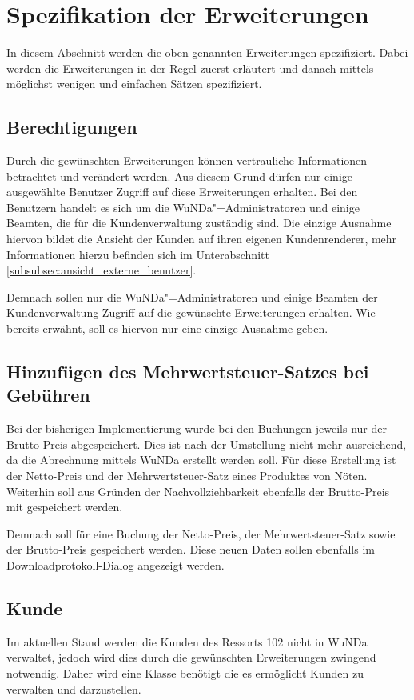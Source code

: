 \section{Spezifikation der Erweiterungen} \label{sec:spezifikation}
In diesem Abschnitt werden die oben genannten Erweiterungen spezifiziert. Dabei werden die Erweiterungen in der Regel zuerst erläutert und danach mittels möglichst wenigen und einfachen Sätzen spezifiziert.

\subsection{Berechtigungen} \label{subsec:berechtigungen}
Durch die gewünschten Erweiterungen können vertrauliche Informationen betrachtet und verändert werden.
Aus diesem Grund dürfen nur einige ausgewählte Benutzer Zugriff auf diese Erweiterungen erhalten.
Bei den Benutzern handelt es sich um die \ac{WuNDa}"=Administratoren und einige Beamten, die für die Kundenverwaltung zuständig sind.
Die einzige Ausnahme hiervon bildet die Ansicht der Kunden auf ihren eigenen Kundenrenderer, mehr Informationen hierzu befinden sich im Unterabschnitt \autoref{subsubsec:ansicht_externe_benutzer}. 

Demnach sollen nur die \ac{WuNDa}"=Administratoren und einige Beamten der Kundenverwaltung Zugriff auf die gewünschte Erweiterungen erhalten. Wie bereits erwähnt, soll es hiervon nur eine einzige Ausnahme geben.

\subsection{Hinzufügen des Mehrwertsteuer-Satzes bei Gebühren}
Bei der bisherigen Implementierung wurde bei den Buchungen jeweils nur der Brutto-Preis abgespeichert. Dies ist nach der Umstellung nicht mehr ausreichend, da die Abrechnung mittels \ac{WuNDa} erstellt werden soll. Für diese Erstellung ist der Netto-Preis und der Mehrwertsteuer-Satz eines Produktes von Nöten. Weiterhin soll aus Gründen der Nachvollziehbarkeit ebenfalls der Brutto-Preis mit gespeichert werden.

Demnach soll für eine Buchung der Netto-Preis, der Mehrwertsteuer-Satz sowie der Brutto-Preis gespeichert werden. Diese neuen Daten sollen ebenfalls im Downloadprotokoll-Dialog angezeigt werden.
\subsection{Kunde}
Im aktuellen Stand werden die Kunden des Ressorts 102 nicht in \ac{WuNDa} verwaltet, jedoch wird dies durch die gewünschten Erweiterungen zwingend notwendig. Daher wird eine Klasse  benötigt die es ermöglicht Kunden zu verwalten und darzustellen. 

